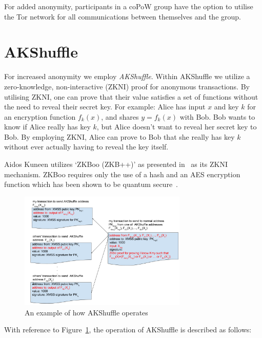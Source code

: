 \documentclass[a4paper,10pt,twocolumn]{article}
\begin{document}
For added anonymity, participants in a coPoW group have the option to utilise the Tor network for all communications between themselves 
and the group. 

\section{AKShuffle}
\label{sec:aks}

For increased anonymity we employ \emph{AKShuffle}. Within AKShuffle we utilize a zero-knowledge, non-interactive (ZKNI) proof for
anonymous transactions. By utilising ZKNI, one can prove that their value satisfies a set of functions without the need to reveal their 
secret key. For example: Alice has input \(x\) and key \( k \) for an encryption function \( f_{k}(x) \), and shares \( y=f_k(x) \) 
with Bob. Bob wants to know if Alice really has key \(k\), but Alice doesn't want to reveal her secret key to Bob. By employing ZKNI, 
Alice can prove to Bob that she really has key \( k\) without ever actually having to reveal the key itself.

Aidos Kuneen utilizes `ZKBoo (ZKB++)' as presented in~\cite{zkb} as its ZKNI mechanism. ZKBoo requires only the use of a hash and an 
AES encryption function which has been shown to be quantum secure~\cite{pqcrypto}.

\begin{figure}[ht]
	\begin{center}
	\includegraphics[width=80mm]{shuffle.png}
	  \caption{An example of how AKShuffle operates}
    \label{fig:shuffle}
	\end{center}
 \end{figure}

With reference to Figure~\ref{fig:shuffle}, the operation of AKShuffle is described as follows:
\end{document}
